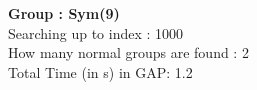 \textbf{Group : Sym(9)}\\
Searching up to index : 1000\\
How many normal groups are found : 2\\
Total Time (in s) in GAP: 1.2\\
